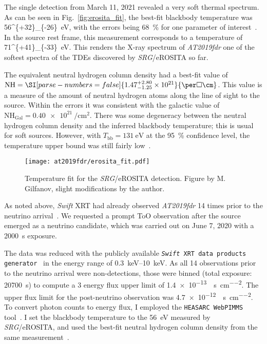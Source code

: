 The single detection from March 11, 2021 revealed a very soft thermal spectrum. As can be seen in Fig.~\ref{fig:erosita_fit}, the best-fit blackbody temperature was \SI[parse-numbers = false]{56^{+32}_{-26}}{\eV}, with the errors being \SI{68}{\percent} for one parameter of interest~. In the source rest frame, this measurement corresponds to a temperature of \SI[parse-numbers = false]{71^{+41}_{-33}}{\eV}. This renders the X-ray spectrum of \emph{AT2019fdr} one of the softest spectra of the TDEs discovered by \textit{SRG}/eROSITA so far.

The equivalent neutral hydrogen column density had a best-fit value of $\text{NH}=\SI[parse-numbers = false]{1.47^{+2.80}_{-1.25}\times10^{21}}{\per\square\cm}$. This value is a measure of the amount of neutral hydrogen atoms along the line of sight to the source. Within the errors it was consistent with the galactic value of $\text{NH}_\text{Gal} = \SI{0.40e21}{\per\square\cm}$. There was some degeneracy between the neutral hydrogen column density and the inferred blackbody temperature; this is usual for soft sources. However, with $T_\text{bb}=\SI{131}{\eV}$ at the \SI{95}{\percent} confidence level, the temperature upper bound was still fairly low~\cite{Reusch2022}.

\begin{figure}[htb]
    \texttt{[image: at2019fdr/erosita\_fit.pdf]}
    \caption[\textit{SRG}/eROSITA temperature fit]{Temperature fit for the \textit{SRG}/eROSITA detection. Figure by M. Gilfanov, slight modifications by the author.}
\end{figure}

As noted above, \textit{Swift} XRT had already observed \emph{AT2019fdr} 14 times prior to the neutrino arrival~\cite{Frederick2021}. We requested a prompt ToO observation after the source emerged as a neutrino candidate, which was carried out on June 7, 2020 with a \SI{2000}{\s} exposure.

The data was reduced with the publicly available \texttt{\textit{Swift} XRT data products generator}~ in the energy range of \SIrange{0.3}{10}{\kilo\eV}. As all 14 observations prior to the neutrino arrival were non-detections, those were binned (total exposure: \SI{20700}{\s}) to compute a \SI{3}{\sigma} energy flux upper limit of \SI{1.4e-13}{\erg\per\s\per\square\cm}. The upper flux limit for the post-neutrino observation was \SI{4.7e-12}{\erg\per\s\per\square\cm}. To convert photon counts to energy flux, I employed the \texttt{HEASARC WebPIMMS} tool~. I set the blackbody temperature to the \SI{56}{\eV} measured by \textit{SRG}/eROSITA, and used the best-fit neutral hydrogen column density from the same measurement~\cite{Reusch2022}.

